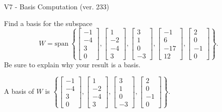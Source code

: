 \begin{exercise}
  \begin{exerciseTitle}V7 - Basis Computation (ver. 233)\end{exerciseTitle}
  \begin{exerciseStatement}
    Find a basis for the subspace 
\[W=\mathrm{span}\ \left\{\left[\begin{array}{r}
-1 \\
-4 \\
3 \\
0
\end{array}\right] , \left[\begin{array}{r}
1 \\
-2 \\
-4 \\
3
\end{array}\right] , \left[\begin{array}{r}
3 \\
1 \\
0 \\
-3
\end{array}\right] , \left[\begin{array}{r}
-1 \\
6 \\
-17 \\
12
\end{array}\right] , \left[\begin{array}{r}
2 \\
0 \\
-1 \\
0
\end{array}\right]\right\}.\]
 Be sure to explain why your result is a basis.


  \end{exerciseStatement}
  \begin{exerciseAnswer}
   A basis of \(W\) is  \(\left\{\left[\begin{array}{r}
-1 \\
-4 \\
3 \\
0
\end{array}\right] , \left[\begin{array}{r}
1 \\
-2 \\
-4 \\
3
\end{array}\right] , \left[\begin{array}{r}
3 \\
1 \\
0 \\
-3
\end{array}\right] , \left[\begin{array}{r}
2 \\
0 \\
-1 \\
0
\end{array}\right]\right\}\).
  


  \end{exerciseAnswer}
\end{exercise}